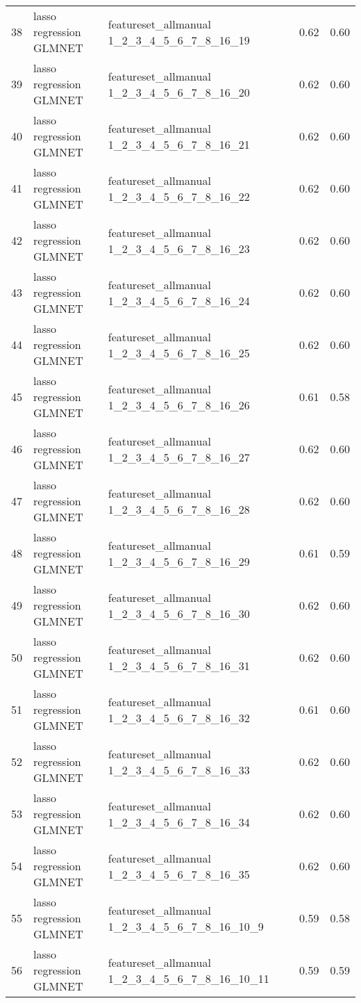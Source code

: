 \begin{tabular}{cllcc}
  38 & lasso regression GLMNET & featureset\_allmanual 1\_2\_3\_4\_5\_6\_7\_8\_16\_19 & 0.62 & 0.60 \\ 
  39 & lasso regression GLMNET & featureset\_allmanual 1\_2\_3\_4\_5\_6\_7\_8\_16\_20 & 0.62 & 0.60 \\ 
  40 & lasso regression GLMNET & featureset\_allmanual 1\_2\_3\_4\_5\_6\_7\_8\_16\_21 & 0.62 & 0.60 \\ 
  41 & lasso regression GLMNET & featureset\_allmanual 1\_2\_3\_4\_5\_6\_7\_8\_16\_22 & 0.62 & 0.60 \\ 
  42 & lasso regression GLMNET & featureset\_allmanual 1\_2\_3\_4\_5\_6\_7\_8\_16\_23 & 0.62 & 0.60 \\ 
  43 & lasso regression GLMNET & featureset\_allmanual 1\_2\_3\_4\_5\_6\_7\_8\_16\_24 & 0.62 & 0.60 \\ 
  44 & lasso regression GLMNET & featureset\_allmanual 1\_2\_3\_4\_5\_6\_7\_8\_16\_25 & 0.62 & 0.60 \\ 
  45 & lasso regression GLMNET & featureset\_allmanual 1\_2\_3\_4\_5\_6\_7\_8\_16\_26 & 0.61 & 0.58 \\ 
  46 & lasso regression GLMNET & featureset\_allmanual 1\_2\_3\_4\_5\_6\_7\_8\_16\_27 & 0.62 & 0.60 \\ 
  47 & lasso regression GLMNET & featureset\_allmanual 1\_2\_3\_4\_5\_6\_7\_8\_16\_28 & 0.62 & 0.60 \\ 
  48 & lasso regression GLMNET & featureset\_allmanual 1\_2\_3\_4\_5\_6\_7\_8\_16\_29 & 0.61 & 0.59 \\ 
  49 & lasso regression GLMNET & featureset\_allmanual 1\_2\_3\_4\_5\_6\_7\_8\_16\_30 & 0.62 & 0.60 \\ 
  50 & lasso regression GLMNET & featureset\_allmanual 1\_2\_3\_4\_5\_6\_7\_8\_16\_31 & 0.62 & 0.60 \\ 
  51 & lasso regression GLMNET & featureset\_allmanual 1\_2\_3\_4\_5\_6\_7\_8\_16\_32 & 0.61 & 0.60 \\ 
  52 & lasso regression GLMNET & featureset\_allmanual 1\_2\_3\_4\_5\_6\_7\_8\_16\_33 & 0.62 & 0.60 \\ 
  53 & lasso regression GLMNET & featureset\_allmanual 1\_2\_3\_4\_5\_6\_7\_8\_16\_34 & 0.62 & 0.60 \\ 
  54 & lasso regression GLMNET & featureset\_allmanual 1\_2\_3\_4\_5\_6\_7\_8\_16\_35 & 0.62 & 0.60 \\ 
  55 & lasso regression GLMNET & featureset\_allmanual 1\_2\_3\_4\_5\_6\_7\_8\_16\_10\_9 & 0.59 & 0.58 \\ 
  56 & lasso regression GLMNET & featureset\_allmanual 1\_2\_3\_4\_5\_6\_7\_8\_16\_10\_11 & 0.59 & 0.59 \\ 

\end{tabular}
